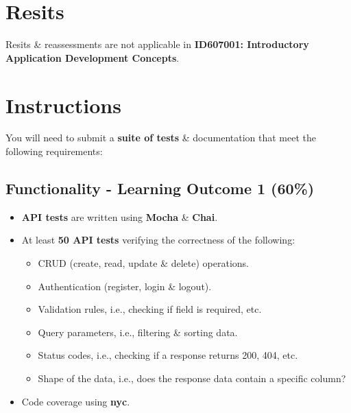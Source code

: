 \documentclass{article}
\begin{document}
\section*{Resits}
Resits \& reassessments are not applicable in \textbf{ID607001: Introductory Application Development Concepts}. 

\newpage

\section*{Instructions}
You will need to submit a \textbf{suite of tests} \& documentation that meet the following requirements:

\subsection*{Functionality - Learning Outcome 1 (60\%)}
\begin{itemize}
    \item \textbf{API tests} are written using \textbf{Mocha} \& \textbf{Chai}.
    \item At least \textbf{50 API tests} verifying the correctness of the following:
          \begin{itemize}
            \item CRUD (create, read, update \& delete) operations.
            \item Authentication (register, login \& logout).
            \item Validation rules, i.e., checking if field is required, etc.
            \item Query parameters, i.e., filtering \& sorting data.
            \item Status codes, i.e., checking if a response returns 200, 404, etc.
            \item Shape of the data, i.e., does the response data contain a specific column?
          \end{itemize}
    \item Code coverage using \textbf{nyc}. 
\end{itemize}
\end{document}
